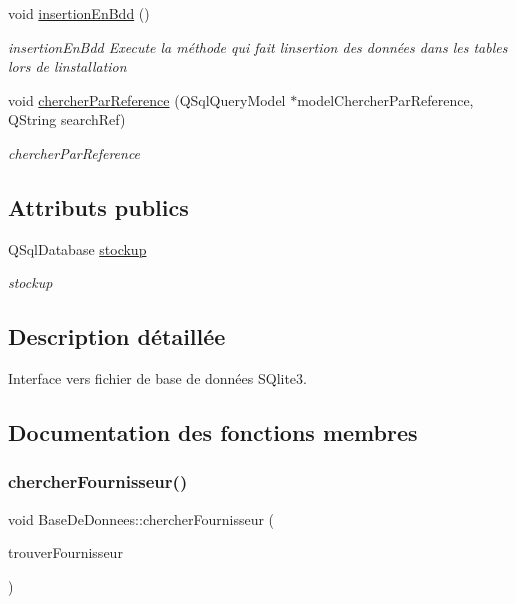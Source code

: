 \begin{DoxyCompactItemize}
void \mbox{\hyperlink{class_base_de_donnees_a1aa6b997245767e4ba75973d59dcfaf6}{insertion\+En\+Bdd}} ()
\begin{DoxyCompactList}\small\item\em insertion\+En\+Bdd Execute la méthode qui fait l\textquotesingle{}insertion des données dans les tables lors de l\textquotesingle{}installation \end{DoxyCompactList}\item 
void \mbox{\hyperlink{class_base_de_donnees_aaa4a62ca5864ce24cb0b3d488a609811}{chercher\+Par\+Reference}} (Q\+Sql\+Query\+Model $\ast$model\+Chercher\+Par\+Reference, Q\+String search\+Ref)
\begin{DoxyCompactList}\small\item\em chercher\+Par\+Reference \end{DoxyCompactList}\end{DoxyCompactItemize}
\subsection*{Attributs publics}
\begin{DoxyCompactItemize}
\item 
\mbox{\label{class_base_de_donnees_a2527e35f95ca7abc94d61eabe2b8ef17}} 
Q\+Sql\+Database \mbox{\hyperlink{class_base_de_donnees_a2527e35f95ca7abc94d61eabe2b8ef17}{stockup}}
\begin{DoxyCompactList}\small\item\em stockup \end{DoxyCompactList}\end{DoxyCompactItemize}


\subsection{Description détaillée}
Interface vers fichier de base de données S\+Qlite3. 

\subsection{Documentation des fonctions membres}
\mbox{\label{class_base_de_donnees_aaff06392cdd1aa3e3e66f1bb8214d1fb}} 
\subsubsection{\texorpdfstring{chercher\+Fournisseur()}{chercherFournisseur()}}
{\footnotesize\ttfamily void Base\+De\+Donnees\+::chercher\+Fournisseur (\begin{DoxyParamCaption}\item[{Q\+String}]{trouver\+Fournisseur }\end{DoxyParamCaption})}




